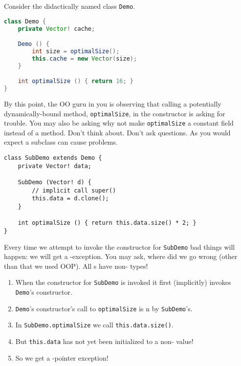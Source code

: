 \documentclass{article}
\begin{document}
\begin{example}
  Consider the didactically named class \texttt{Demo}.
\begin{lstlisting}[escapechar=|, language=Java]
class Demo {
    private Vector! cache;

    Demo () {
        int size = optimalSize();
        this.cache = new Vector(size);
    }

    int optimalSize () { return 16; }
}
\end{lstlisting}
  By this point, the OO guru in you is observing that calling a potentially dynamically-bound method, \texttt{optimalSize}, in the constructor is asking for trouble.
  You may also be asking why not make \texttt{optimalSize} a constant field instead of a method.
  Don't think about.
  Don't ask questions.
  As you would expect a subclass can cause problems.
\begin{lstlisting}
class SubDemo extends Demo {
    private Vector! data;

    SubDemo (Vector! d) {
        // implicit call super()
        this.data = d.clone();
    }

    int optimalSize () { return this.data.size() * 2; }
}
\end{lstlisting}
  Every time we attempt to invoke the constructor for \texttt{SubDemo} bad things will happen: we will get a \cringe{}-exception.
  You may ask, where did we go wrong (other than that we used OOP).
  All \receiver{}s have non-\cringe{} types!
  \begin{enumerate}
  \item When the constructor for \texttt{SubDemo} is invoked it first (implicitly) invokes \texttt{Demo}'s constructor.
  \item \texttt{Demo}'s constructor's call to \texttt{optimalSize} is \overide{}n by \texttt{SubDemo}'s.
  \item In \texttt{SubDemo.optimalSize} we call \texttt{this.data.size()}.
  \item But \texttt{this.data} has not yet been initialized to a non-\cringe{} value!
  \item So we get a \cringe{}-pointer exception!
  \end{enumerate}
\end{example}
\end{document}
